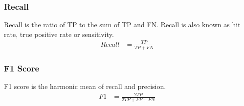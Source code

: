 \documentclass[a4paper,12pt,twoside]{report}
\begin{document}
\subsubsection{Recall} 
Recall is the ratio of TP to the sum of TP and FN. Recall is also known as hit rate, true positive rate or sensitivity.
\begin{align*}
Recall &= \frac{TP}{TP +FN}
\end{align*}

\subsubsection{F1 Score} 
F1 score is the harmonic mean of recall and precision. 
\begin{align*}
F1 &= \frac{2TP}{2TP + FP + FN}
\end{align*}
\end{document}
